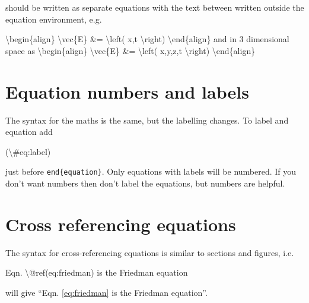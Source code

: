 \documentclass[]{book}
\newenvironment{Shaded}{\begin{snugshade}}{\end{snugshade}}
\newcommand{\NormalTok}[1]{#1}
\begin{document}
should be written as separate equations with the text between written outside the equation environment, e.g.

\begin{Shaded}
\begin{Highlighting}[]
\NormalTok{\textbackslash{}begin\{align\}}
\NormalTok{\textbackslash{}vec\{E\} &= \textbackslash{}left( x,t \textbackslash{}right)}
\NormalTok{\textbackslash{}end\{align\}}
\NormalTok{and in 3 dimensional space as}
\NormalTok{\textbackslash{}begin\{align\}}
\NormalTok{\textbackslash{}vec\{E\} &= \textbackslash{}left( x,y,z,t \textbackslash{}right)}
\NormalTok{\textbackslash{}end\{align\}}
\end{Highlighting}
\end{Shaded}

\hypertarget{sec:eq-nos-labels}{%
\section{Equation numbers and labels}\label{sec:eq-nos-labels}}

The syntax for the maths is the same, but the labelling changes. To label and equation add

\begin{Shaded}
\begin{Highlighting}[]
\NormalTok{(\textbackslash{}#eq:label)}
\end{Highlighting}
\end{Shaded}

just before \texttt{end\{equation\}}. Only equations with labels will be numbered. If you don't want numbers then don't label the equations, but numbers are helpful.

\hypertarget{sec:cross-ref-eqs}{%
\section{Cross referencing equations}\label{sec:cross-ref-eqs}}

The syntax for cross-referencing equations is similar to sections and figures, i.e.

\begin{Shaded}
\begin{Highlighting}[]
\NormalTok{Eqn. \textbackslash{}@ref(eq:friedman) is the Friedman equation}
\end{Highlighting}
\end{Shaded}

will give ``Eqn. \eqref{eq:friedman} is the Friedman equation''.
\end{document}
